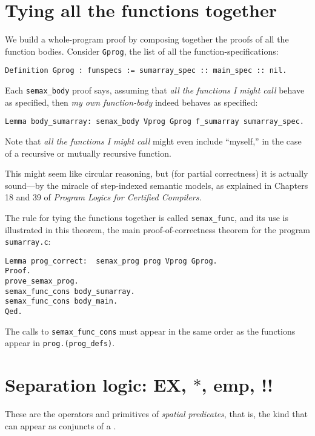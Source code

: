 \documentclass[12pt,fleqn,openany,oneside,showtrims]{memoir}
\begin{document}
\chapter{Tying all the functions together}
\label{end-ide}

We build a whole-program proof by composing together
the proofs of all the function bodies.
Consider \lstinline{Gprog}, the list of all
the function-specifications:
\begin{lstlisting}
Definition Gprog : funspecs := sumarray_spec :: main_spec :: nil.
\end{lstlisting}

Each \lstinline{semax_body} proof says,
assuming that \emph{all the functions I might call}
behave as specified, then \emph{my own function-body}
indeed behaves as specified:
\begin{lstlisting}
Lemma body_sumarray: semax_body Vprog Gprog f_sumarray sumarray_spec.
\end{lstlisting}

Note that \emph{all the functions I might call}
might even include ``myself,'' in the case of a
recursive or mutually recursive function.

This might seem like circular reasoning, but
(for partial correctness)
it is actually sound---by the miracle of
step-indexed semantic models, as explained in
Chapters 18 and 39 of \emph{Program Logics for Certified Compilers.}

The rule for tying the functions together is
called \lstinline{semax_func}, and its use is illustrated
in this theorem, the main proof-of-correctness
theorem for the program \lstinline{sumarray.c}:

\begin{lstlisting}
Lemma prog_correct:  semax_prog prog Vprog Gprog.
Proof.
prove_semax_prog.
semax_func_cons body_sumarray.
semax_func_cons body_main.
Qed.
\end{lstlisting}
The calls to \lstinline{semax_func_cons}
must appear in the same order as the functions
appear in \lstinline{prog.(prog_defs)}.


\chapter{Separation logic: \upshape \textsf{EX}, $*$, \textsf{emp}, !!}
\label{refcard:separation-logic}
These are the operators and primitives of
\emph{spatial predicates}, that is,
the kind that can appear as conjuncts of a \SEP{}.
\end{document}
